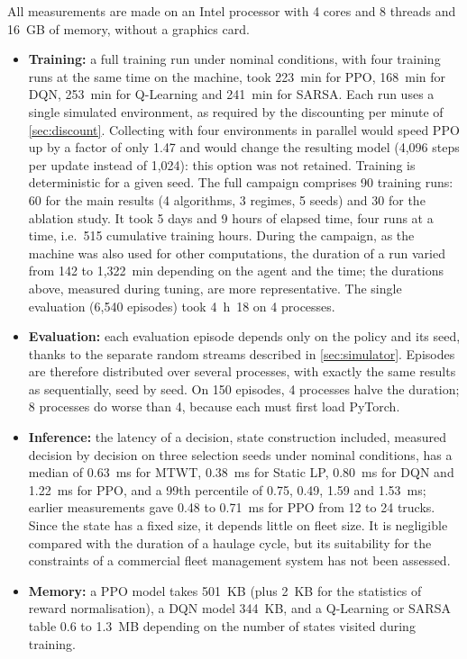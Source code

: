 \documentclass[11pt,a4paper]{article}
\newif\ifrevmarks
\newcommand{\revtag}[1]{\ifrevmarks\textsuperscript{\textcolor{red!70!black}{\scriptsize[#1]}}\fi}
\newcommand{\rev}[2]{\ifrevmarks{\color{revcolor}#2}\revtag{#1}\else#2\fi}
\newenvironment{revbloc}[1]{\par\ifrevmarks\color{revcolor}\noindent\revtag{#1}\ \fi}{\par}
\newif\ifcorrmarks
\newcommand{\corr}[1]{\ifcorrmarks\textcolor{corrcolor}{#1}\else#1\fi}
\begin{document}
\begin{revbloc}{M28, m20, m24, v3}
All measurements are made \corr{on an Intel processor with 4 cores and 8 threads and 16~GB of memory}, without a graphics card.
\begin{itemize}
  \item \textbf{Training:} a full training run under nominal conditions, with four training runs at the same time on the machine, took 223~min for PPO, 168~min for DQN, 253~min for Q-Learning and 241~min for SARSA. Each run uses a single simulated environment, as required by the discounting per minute of \cref{sec:discount}. Collecting with four environments in parallel would speed PPO up by a factor of only 1.47 and would change the resulting model (4{,}096 steps per update instead of 1{,}024): this option was not retained. Training is deterministic for a given seed. \rev{T31}{The full campaign comprises 90 training runs: 60 for the main results (4 algorithms, 3 regimes, 5 seeds) and 30 for the ablation study. It took \corr{5 days and 9 hours of elapsed time}, four runs at a time, i.e.\ 515 cumulative training hours. During the campaign, as the machine was also used for other computations, the duration of a run varied from 142 to 1{,}322~min depending on the agent and the time; the durations above, measured during tuning, are more representative. The single evaluation (6{,}540 episodes) took 4~h~18 on 4 processes.}
  \item \textbf{Evaluation:} each evaluation episode depends only on the policy and its seed, thanks to the separate random streams described in \cref{sec:simulator}. Episodes are therefore distributed over several processes, with exactly the same results as sequentially, seed by seed. On 150 episodes, 4 processes halve the duration; 8 processes do worse than 4, because each must first load PyTorch.
  \item \textbf{Inference:} \corr{the latency of a decision, state construction included, measured decision by decision on three selection seeds under nominal conditions, has a median of 0.63~ms for MTWT, 0.38~ms for \corr{Static LP}, 0.80~ms for DQN and 1.22~ms for PPO, and a 99th percentile of 0.75, 0.49, 1.59 and 1.53~ms; earlier measurements gave 0.48 to 0.71~ms for PPO from 12 to 24 trucks.} Since the state has a fixed size, it depends little on fleet size. It is negligible compared with the duration of a haulage cycle, but its suitability for the constraints of a commercial fleet management system has not been assessed.
  \item \textbf{Memory:} \rev{T31}{a PPO model takes 501~KB (plus 2~KB for the statistics of reward normalisation), a DQN model 344~KB, and a Q-Learning or SARSA table 0.6 to 1.3~MB depending on the number of states visited during training.}
\end{itemize}
\end{revbloc}
\end{document}

